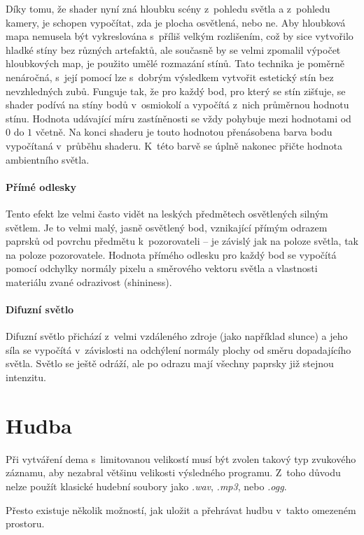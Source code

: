 Díky tomu, že shader nyní zná hloubku scény z~pohledu světla a z~pohledu kamery, je schopen vypočítat, zda je plocha osvětlená, nebo ne.
Aby hloubková mapa nemusela být vykreslována s~příliš velkým rozlišením, což by sice vytvořilo hladké stíny bez různých artefaktů, ale současně by se velmi zpomalil výpočet hloubkových map, je použito umělé rozmazání stínů.
Tato technika je poměrně nenáročná, s~její pomocí lze s~dobrým výsledkem vytvořit estetický stín bez nevzhledných zubů.
Funguje tak, že pro každý bod, pro který se stín zišťuje, se shader podívá na stíny bodů v~osmiokolí a vypočítá z~nich průměrnou hodnotu stínu.
Hodnota udávající míru zastíněnosti se vždy pohybuje mezi hodnotami od $0$ do $1$ včetně.
Na konci shaderu je touto hodnotou přenásobena barva bodu vypočítaná v~průběhu shaderu.
K~této barvě se úplně nakonec přičte hodnota ambientního světla.

\subsubsection{Přímé odlesky}
Tento efekt lze velmi často vidět na leských předmětech osvětlených silným světlem.
Je to velmi malý, jasně osvětlený bod, vznikající přímým odrazem paprsků od povrchu předmětu k~pozorovateli -- je závislý jak na poloze světla, tak na poloze pozorovatele.
Hodnota přímého odlesku pro každý bod se vypočítá pomocí odchylky normály pixelu a směrového vektoru světla a vlastnosti materiálu zvané odrazivost (shininess). 

\subsubsection{Difuzní světlo}
Difuzní světlo přichází z~velmi vzdáleného zdroje (jako například slunce) a jeho síla se vypočítá v~závislosti na odchýlení normály plochy od směru dopadajícího světla.
Světlo se ještě odráží, ale po odrazu mají všechny paprsky již stejnou intenzitu.

\chapter{Hudba} \label{hudba}
Při vytváření dema s~limitovanou velikostí musí být zvolen takový typ zvukového záznamu, aby nezabral většinu velikosti výsledného programu.
Z~toho důvodu nelze použít klasické hudební soubory jako \emph{.wav}, \emph{.mp3}, nebo \emph{.ogg}. 

Přesto existuje několik možností, jak uložit a přehrávat hudbu v~takto omezeném prostoru.

